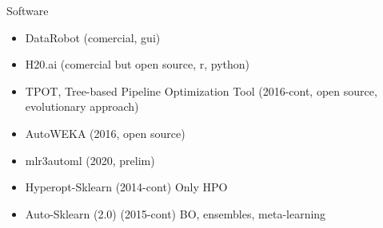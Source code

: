 \begin{frame}{Software}

\begin{itemize}
  \item DataRobot (comercial, gui)
  \item H20.ai (comercial but open source, r, python)
  \item TPOT, Tree-based Pipeline Optimization Tool  (2016-cont, open source, evolutionary approach) %
  \item AutoWEKA (2016, open source)
  \item mlr3automl (2020, prelim)
  \item Hyperopt-Sklearn (2014-cont) Only HPO
  \item Auto-Sklearn (2.0) (2015-cont) BO, ensembles, meta-learning
\end{itemize}

\end{frame}




